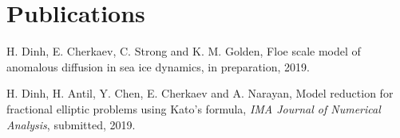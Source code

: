 \newcommand{\arxiv}[1]{[\href{http://arxiv.org/abs/#1}{arXiv:#1}]}


\setcounter{numPubs}{1}
\setcounter{pubCounter}{\value{numPubs}}


\section{\sc Publications}
\begin{etaremune}[start=\value{pubCounter}]
   \item[  ] 
  H. Dinh, E. Cherkaev, C. Strong and K. M. Golden, Floe scale model of anomalous diffusion in sea ice dynamics, in preparation, 2019.
  \item[  ]
  H. Dinh, H. Antil, Y. Chen, E. Cherkaev and A. Narayan, Model reduction for fractional elliptic problems using Kato's formula, {\it IMA Journal of Numerical Analysis}, submitted, 2019.

 \end{etaremune}



